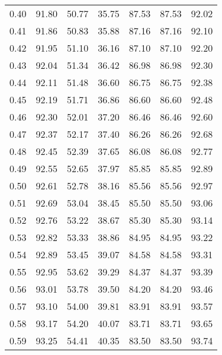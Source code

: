 \begin{tabular}{|c|c|c|c|c|c|c|}
      0.40 &     91.80 &     50.77 &      35.75 &   87.53 &      87.53 &         92.02 \\
      0.41 &     91.86 &     50.83 &      35.88 &   87.16 &      87.16 &         92.10 \\
      0.42 &     91.95 &     51.10 &      36.16 &   87.10 &      87.10 &         92.20 \\
      0.43 &     92.04 &     51.34 &      36.42 &   86.98 &      86.98 &         92.30 \\
      0.44 &     92.11 &     51.48 &      36.60 &   86.75 &      86.75 &         92.38 \\
      0.45 &     92.19 &     51.71 &      36.86 &   86.60 &      86.60 &         92.48 \\
      0.46 &     92.30 &     52.01 &      37.20 &   86.46 &      86.46 &         92.60 \\
      0.47 &     92.37 &     52.17 &      37.40 &   86.26 &      86.26 &         92.68 \\
      0.48 &     92.45 &     52.39 &      37.65 &   86.08 &      86.08 &         92.77 \\
      0.49 &     92.55 &     52.65 &      37.97 &   85.85 &      85.85 &         92.89 \\
      0.50 &     92.61 &     52.78 &      38.16 &   85.56 &      85.56 &         92.97 \\
      0.51 &     92.69 &     53.04 &      38.45 &   85.50 &      85.50 &         93.06 \\
      0.52 &     92.76 &     53.22 &      38.67 &   85.30 &      85.30 &         93.14 \\
      0.53 &     92.82 &     53.33 &      38.86 &   84.95 &      84.95 &         93.22 \\
      0.54 &     92.89 &     53.45 &      39.07 &   84.58 &      84.58 &         93.31 \\
      0.55 &     92.95 &     53.62 &      39.29 &   84.37 &      84.37 &         93.39 \\
      0.56 &     93.01 &     53.78 &      39.50 &   84.20 &      84.20 &         93.46 \\
      0.57 &     93.10 &     54.00 &      39.81 &   83.91 &      83.91 &         93.57 \\
      0.58 &     93.17 &     54.20 &      40.07 &   83.71 &      83.71 &         93.65 \\
      0.59 &     93.25 &     54.41 &      40.35 &   83.50 &      83.50 &         93.74 \\

\end{tabular}
